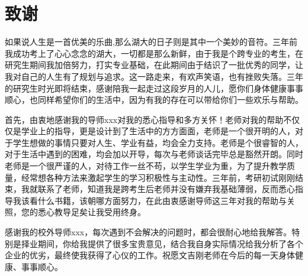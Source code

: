 \chapter*{致\quad 谢}


%
%
%
%
%
%
%
如果说人生是一首优美的乐曲,那么湖大的日子则是其中一个美妙的音符。三年前我成功考上了心心念念的湖大，一切都是那么新鲜，由于我是个跨专业的考生，在研究生期间我加倍努力，打实专业基础，在此期间由于结识了一批优秀的同学，让我对自己的人生有了规划与追求。这一路走来，有欢声笑语，也有挫败失落。三年的研究生时光即将结束，感谢陪我一起走过这段岁月的人儿，愿你们身体健康事事顺心，也同样希望你们的生活中，因为有我的存在可以带给你们一些欢乐与帮助。

首先，由衷地感谢我的导师xxx对我的悉心指导和多方关怀！老师对我的帮助不仅仅是学业上的指导，更是设计到了生活中的方方面面，老师是一个很开明的人，对于学生想做的事情只要对人生、学业有益，均会全力支持。老师是个很睿智的人，对于生活中遇到的困难，均会加以开导，每次与老师谈话完毕总是豁然开朗。同时老师是一个很严谨的人，对待工作一丝不苟，以学生学业为重，为了提升教学质量，经常想各种方法来激起学生的学习积极性与主动性。三年前，考研初试刚刚结束，我就联系了老师，知道我是跨考生后老师并没有嫌弃我基础薄弱，反而悉心指导我该看什么书籍，该朝哪方面努力，在此由衷感谢导师这三年对我的帮助与关照，您的悉心教导足矣让我受用终身。

感谢我的校外导师xxx，每次遇到不会解决的问题时，都会很耐心地给我解答。特别是择业期间，你给我提供了很多宝贵意见，结合我自身实际情况给我分析了各个企业的优劣，最终使我获得了心仪的工作。祝愿文吉刚老师在今后的每一天身体健康、事事顺心。

